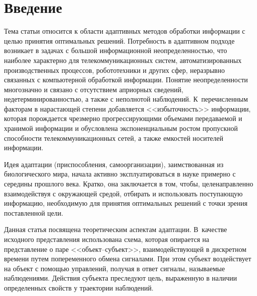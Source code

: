       \begin{multicols}{2}

            \label{st\stat}


\section{Введение}

  Тема статьи относится к области адаптивных методов обработки информации с целью 
принятия оптимальных решений. Потребность в адаптивном\linebreak
подходе возникает в задачах 
с большой информационной неопределенностью, что наиболее характерно для 
телекоммуникационных систем, автоматизированных производственных процессов, 
робототех\-ни\-ки и других сфер, неразрывно связанных с компьютерной обработкой 
информации. Понятие неопределенности многозначно и связано с отсутствием априорных 
сведений, недетерминированностью, а также с неполнотой наблюдений. 
К~перечисленным факторам в нарастающей степени добавляется <<избыточность>> 
информации, которая порождается чрезмерно прогрессирующими объемами 
передаваемой и хранимой информации и обусловлена экспоненциальным ростом 
пропускной способности телекоммуникационных сетей, а также емкостей носителей 
информации.
  
  Идея адаптации (приспособления, самоорганизации), заимствованная из 
биологического мира, начала активно эксплуатироваться в науке примерно с середины 
прошлого века. Кратко, она заключается в том, чтобы, целенаправленно взаимодействуя с 
окружающей средой, отбирать и использовать поступающую информацию, необходимую 
для принятия оптимальных решений с точки зрения поставленной цели.
  
  Данная статья посвящена теоретическим аспектам адаптации. В~качестве исходного 
пред\-став\-ле\-ния использована схема, которая опирается на пред\-став\-ление о паре 
  <<объект--субъект>>, взаимодействующей в дискретном времени путем 
попеременного обмена сигналами. При этом субъект воздействует на объект с помощью 
управлений, получая в ответ сигналы, называемые наблюдениями. Действия субъекта 
преследуют цель, выраженную в наличии определенных свойств у траектории 
наблюдений.
  

\end{multicols}
